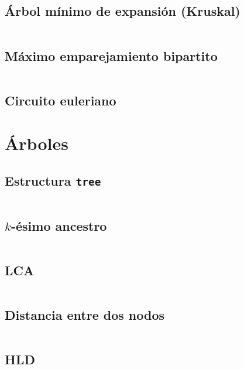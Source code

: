 \documentclass[11pt]{article}
\begin{document}
		\subsection{Árbol mínimo de expansión (Kruskal)}
		\inputminted[tabsize=2,breaklines,firstline=337,lastline=353,fontsize=\small]{c++}{graph.cpp}
		
		\subsection{Máximo emparejamiento bipartito}
		\inputminted[tabsize=2,breaklines,firstline=355,lastline=409,fontsize=\small]{c++}{graph.cpp}
		
		\subsection{Circuito euleriano}
		
		
	\newpage
	\section{Árboles}		
		\subsection{Estructura \texttt{tree}}
		\inputminted[tabsize=2,breaklines,firstline=432,lastline=481,fontsize=\small]{c++}{graph.cpp}
		
		\subsection{$k$-ésimo ancestro}
		\inputminted[tabsize=2,breaklines,firstline=483,lastline=495,fontsize=\small]{c++}{graph.cpp}
		
		\subsection{LCA}
		\inputminted[tabsize=2,breaklines,firstline=497,lastline=516,fontsize=\small]{c++}{graph.cpp}
		
		\subsection{Distancia entre dos nodos}
		\inputminted[tabsize=2,breaklines,firstline=518,lastline=541,fontsize=\small]{c++}{graph.cpp}
		
		\subsection{HLD}
		
\end{document}
